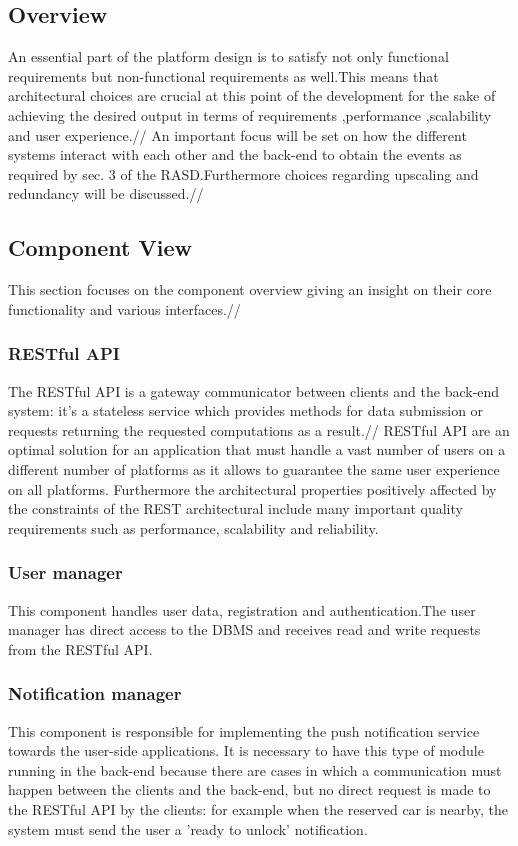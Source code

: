 \subsection{Overview}
An essential part of the platform design is to satisfy not only functional requirements but non-functional requirements as well.This means that architectural choices are crucial at this point of the development for the sake of achieving the desired output in terms of requirements ,performance ,scalability and user experience.//
An important focus will be set on how the different systems interact with each other and the back-end to obtain the events as required by sec. 3 of the RASD.Furthermore choices regarding upscaling and redundancy will be discussed.//

\subsection{Component View}
This section focuses on the component overview giving an insight on their core functionality and various interfaces.//
\subsubsection{RESTful API}
The RESTful API is a gateway communicator between clients and the back-end system: it's a stateless service which provides methods for data submission or requests returning the requested computations as a result.//
RESTful API are an optimal solution for an application that must handle a vast number of users on a different number of platforms as it allows to guarantee the same user experience on all platforms. Furthermore the architectural properties positively affected by the constraints of the REST architectural include many important quality requirements such as performance, scalability and reliability.

\subsubsection{User manager}
This component handles user data, registration and authentication.The user manager has direct access to the DBMS and receives read and write requests from the RESTful API.
\subsubsection{Notification manager}
This component is responsible for implementing the push notification service towards
the user-side applications.
It is necessary to have this type of module running in the back-end because
there are cases in which a communication must happen between the clients and
the back-end, but no direct request is made to the RESTful API by the clients:
for example when the reserved car is nearby, the system must send the user a 'ready to unlock' notification.
